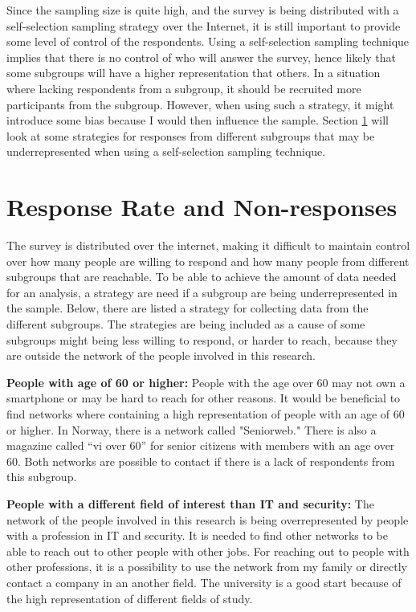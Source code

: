     Since the sampling size is quite high, and the survey is being distributed with a self-selection sampling strategy over the Internet, it is still important to provide some level of control of the respondents. Using a self-selection sampling technique implies that there is no control of who will answer the survey, hence likely that some subgroups will have a higher representation that others. In a situation where lacking respondents from a subgroup, it should be recruited more participants from the subgroup. However, when using such a strategy, it might introduce some bias because I would then influence the sample. Section \ref{sec:response} will look at some strategies for responses from different subgroups that may be underrepresented when using a self-selection sampling technique. 

  \section{Response Rate and Non-responses} \label{sec:response}

    The survey is distributed over the internet, making it difficult to maintain control over how many people are willing to respond and how many people from different subgroups that are reachable. To be able to achieve the amount of data needed for an analysis, a strategy are need if a subgroup are being underrepresented in the sample. Below, there are listed a strategy for collecting data from the different subgroups. The strategies are being included as a cause of some subgroups might being less willing to respond, or harder to reach, because they are outside the network of the people involved in this research.

    {\bf People with age of 60 or higher:} 
    People with the age over 60 may not own a smartphone or may be hard to reach for other reasons. It would be beneficial to find networks where containing a high representation of people with an age of 60 or higher. In Norway, there is a network called "Seniorweb." There is also a magazine called ``vi over 60''  for senior citizens with members with an age over 60. Both networks are possible to contact if there is a lack of respondents from this subgroup.

    {\bf People with a different field of interest than IT and security:} 
    The network of the people involved in this research is being overrepresented by people with a profession in IT and security. It is needed to find other networks to be able to reach out to other people with other jobs. For reaching out to people with other professions, it is a possibility to use the network from my family or directly contact a company in an another field. The university is a good start because of the high representation of different fields of study.

